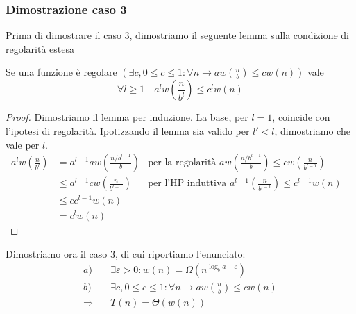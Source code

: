 \subsubsection{Dimostrazione caso 3}
Prima di dimostrare il caso 3, dimostriamo il seguente lemma sulla condizione di regolarità estesa
\begin{lemma}
    Se una funzione è regolare $\left( \exists c, 0 \leq c \leq 1 : \forall n \rightarrow aw\left( \frac{n}{b} \right) \leq cw(n) \right) $
    vale \[ \forall l \geq 1 \quad a^l w\left( \frac{n}{b^l} \right) \leq c^l w(n) \]
    \label{teo:regestesa}
\end{lemma}
\begin{proof}
    Dimostriamo il lemma per induzione. La base, per $l=1$, coincide con l'ipotesi di regolarità. Ipotizzando il lemma sia valido per $l'<l$, dimostriamo che vale per $l$.
    \begin{align*}
        a^l w\left( \frac{n}{b^l} \right)
        &= a^{l-1} a w \left( \frac{n/b^{l-1}}{b} \right)
        & \text{per la regolarità } a w \left( \frac{n/b^{l-1}}{b} \right) \leq cw \left( \frac{n}{b^{l-1}} \right)&\\
        & \leq a^{l-1} cw \left( \frac{n}{b^{l-1}} \right)
        & \text{per l'HP induttiva } a^{l-1} \left( \frac{n}{b^{l-1}} \right) \leq c^{l-1}w(n)&\\
        & \leq cc^{l-1}w(n) \\
        & = c^lw\left( n \right)
    \end{align*}
\end{proof}
Dimostriamo ora il caso $3$, di cui riportiamo l'enunciato:
    \begin{align*}
        a) \quad &\exists \varepsilon > 0 : w(n) = \Omega(n^{\log_b a+\varepsilon}) \\
        b) \quad &\exists c, 0 \leq c \leq 1 : \forall n \rightarrow aw\left( \frac{n}{b} \right) \leq cw(n) \\
        \Rightarrow \quad & T(n) = \Theta \left( w(n) \right)
    \end{align*}
